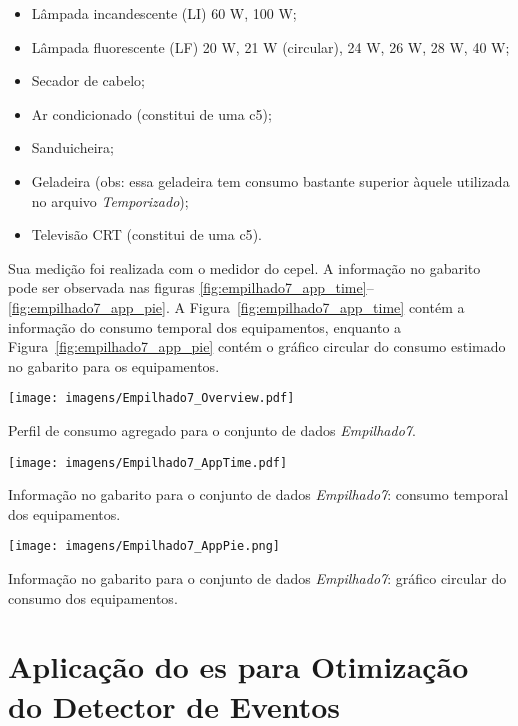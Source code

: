 \begin{itemize}
\item Lâmpada incandescente (LI) 60 W, 100 W;
\item Lâmpada fluorescente (LF) 20 W, 21 W (circular), 24 W, 26 W, 28
W, 40 W;
\item Secador de cabelo;
\item Ar condicionado (constitui de uma \acs{c5});
\item Sanduicheira;
\item Geladeira (obs: essa geladeira tem consumo bastante superior
àquele utilizada no arquivo \emph{Temporizado});
\item Televisão CRT (constitui de uma \acs{c5}).
\end{itemize}

Sua medição foi realizada com o medidor do \acs{cepel}.  A informação
no gabarito pode ser observada nas figuras
\ref{fig:empilhado7_app_time}--\ref{fig:empilhado7_app_pie}.  A
Figura~\ref{fig:empilhado7_app_time} contém a informação do consumo
temporal dos equipamentos, enquanto a
Figura~\ref{fig:empilhado7_app_pie} contém o gráfico circular do
consumo estimado no gabarito para os equipamentos.


\begin{SidewaysFigure}
\centering
\texttt{[image: imagens/Empilhado7\_Overview.pdf]}
\caption{Perfil de consumo agregado para o conjunto de dados \emph{Empilhado7}.}
\label{fig:empilhado7_overview}
\end{SidewaysFigure}

\begin{SidewaysFigure}
\centering
\texttt{[image: imagens/Empilhado7\_AppTime.pdf]}
\caption{Informação no gabarito para o conjunto de dados
\emph{Empilhado7}: consumo temporal dos equipamentos.}
\label{fig:empilhado7_app_time}
\end{SidewaysFigure}

\begin{SidewaysFigure}
\centering
\texttt{[image: imagens/Empilhado7\_AppPie.png]}
\caption{Informação no gabarito para o conjunto de dados
\emph{Empilhado7}: gráfico circular do consumo dos equipamentos.}
\label{fig:empilhado7_app_pie}
\end{SidewaysFigure}

\FloatBarrier

\section[Aplicação do ES para Otimização do Detector de Eventos]{
Aplicação do \acf{es} para Otimização do Detector de Eventos}
\label{sec:aplic_es}

